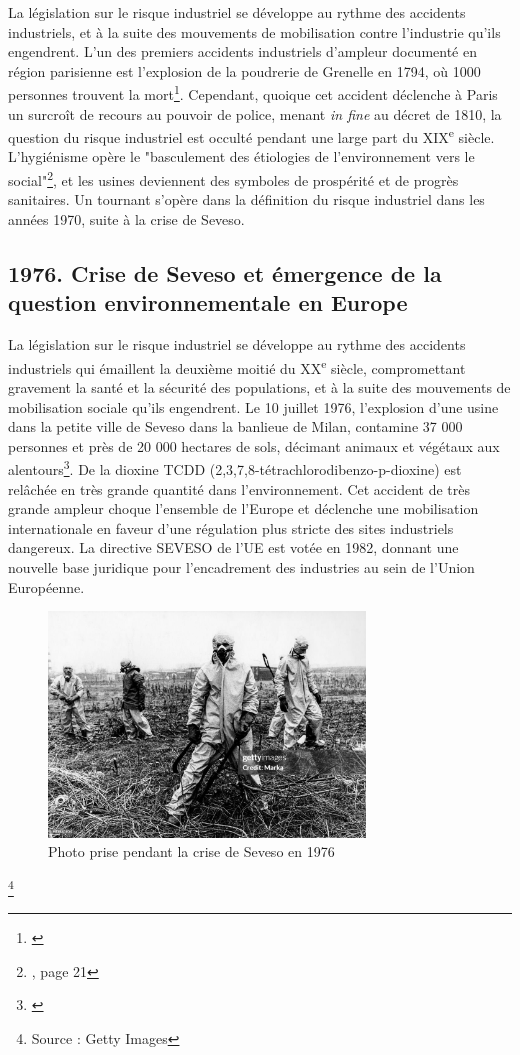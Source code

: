 \documentclass[a4paper,twoside,12pt]{book}
\newcommand{\siecle}[1]{\textsc{#1}\textsuperscript{e} siècle}
\begin{document}
La législation sur le risque industriel se développe au rythme des accidents industriels, et à la suite des mouvements de mobilisation contre l’industrie qu'ils engendrent. L’un des premiers accidents industriels d’ampleur documenté en région parisienne est l’explosion de la poudrerie de Grenelle en 1794, où 1000 personnes trouvent la mort\footnote{\cite{ministere_de_lenvironnement_explosion_2006}}. Cependant, quoique cet accident déclenche à Paris un surcroît de recours au pouvoir de police, menant \textit{in fine} au décret de 1810, la question du risque industriel est occulté pendant une large part du \siecle{XIX}. L'hygiénisme opère le "basculement des étiologies de l'environnement vers le social"\footnote{\cite{fressoz_decret_2011}, page 21}, et les usines deviennent des symboles de prospérité et de progrès sanitaires. Un tournant s'opère dans la définition du risque industriel dans les années 1970, suite à la crise de Seveso.

\subsection{1976. Crise de Seveso et émergence de la question environnementale en Europe}

La législation sur le risque industriel se développe au rythme des accidents industriels qui émaillent la deuxième moitié du \siecle{XX}, compromettant gravement la santé et la sécurité des populations, et à la suite des mouvements de mobilisation sociale qu'ils engendrent. Le 10 juillet 1976, l’explosion d’une usine dans la petite ville de Seveso dans la banlieue de Milan, contamine 37 000 personnes et près de 20 000 hectares de sols, décimant animaux et végétaux aux alentours\footnote{\cite{combe_catastrophe_2020}}. De la dioxine TCDD (2,3,7,8-tétrachlorodibenzo-p-dioxine) est relâchée en très grande quantité dans l’environnement. Cet accident de très grande ampleur choque l’ensemble de l’Europe et déclenche une mobilisation internationale en faveur d'une régulation plus stricte des sites industriels dangereux. La directive SEVESO de l’UE est votée en 1982, donnant une nouvelle base juridique pour l’encadrement des industries au sein de l'Union Européenne. 

\vspace{1em} 
\begin{figure}[!h]
\centering 
\includegraphics[width=0.75\textwidth]{img/chapitre2/SEVESO1976}
\caption{Photo prise pendant la crise de Seveso en 1976}
\end{figure}\footnote{Source : Getty Images}
\end{document}
